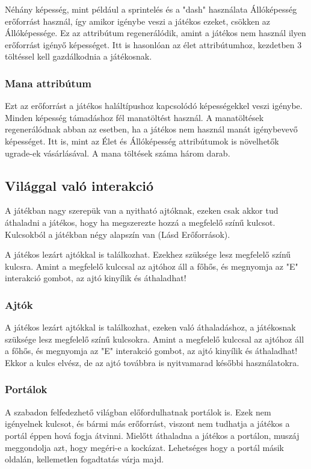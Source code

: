 \documentclass[a4paper]{article}
\begin{document}
Néhány képesség, mint például a sprintelés és a "dash" használata Állóképesség erőforrást használ, így amikor igénybe veszi a játékos ezeket, csökken az Állóképessége.
Ez az attribútum regenerálódik, amint a játékos nem használ ilyen erőforrást igényő képességet.
Itt is hasonlóan az élet attribútumhoz, kezdetben 3 töltéssel kell gazdálkodnia a játékosnak.

\subsubsection{Mana attribútum}

Ezt az erőforrást a játékos haláltípushoz kapcsolódó képességekkel veszi igénybe.
Minden képesség támadáshoz fél manatöltést használ. A manatöltések regenerálódnak abban az esetben, ha a játékos nem használ manát igénybevevő képességet.
Itt is, mint az Élet és Állóképesség attribútumok is növelhetők ugrade-ek vásárlásával.
A mana töltések száma három darab.

\subsection{Világgal való interakció}

A játékban nagy szerepük van a nyitható ajtóknak, ezeken csak akkor tud áthaladni a játékos, hogy ha megszerezte hozzá a megfelelő színű kulcsot.
Kulcsokból a játékban négy alapszín van (Lásd Erőforrások).

A játékos lezárt ajtókkal is találkozhat. Ezekhez szüksége lesz megfelelő színű kulcsra.
Amint a megfelelő kulccsal az ajtóhoz áll a főhős, és megnyomja az "E" interakció gombot, az ajtó kinyílik és áthaladhat!

\subsubsection{Ajtók}

A játékos lezárt ajtókkal is találkozhat, ezeken való áthaladáshoz, a játékosnak szüksége lesz megfelelő színű kulcsokra.
Amint a megfelelő kulccsal az ajtóhoz áll a főhős, és megnyomja az "E" interakció gombot, az ajtó kinyílik és áthaladhat!
Ekkor a kulcs elvész, de az ajtó továbbra is nyitvamarad későbbi használatokra.

\subsubsection{Portálok}

A szabadon felfedezhető világban előfordulhatnak portálok is.
Ezek nem igényelnek kulcsot, és bármi más erőforrást, viszont nem tudhatja a játékos a portál éppen hová fogja átvinni.
Mielőtt áthaladna a játékos a portálon, muszáj meggondolja azt, hogy megéri-e a kockázat. 
Lehetséges hogy a portál másik oldalán, kellemetlen fogadtatás várja majd.
\end{document}

